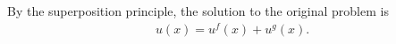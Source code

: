 \documentclass[11pt]{article}
\begin{document}
\begin{solution}
\begin{itemize}
        By the superposition principle, the solution to the original problem is 
        \begin{align}
            u(x) = u^{f}(x) + u^{g}(x).
        \end{align}
%         
%         
% 
    \end{itemize}
\end{solution}
\end{document}
